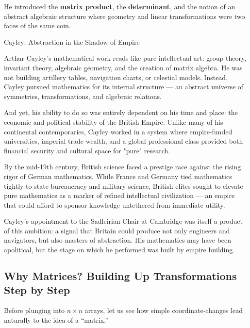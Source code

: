 He introduced the \textbf{matrix product}, the \textbf{determinant}, and the notion of an abstract algebraic structure  
where geometry and linear transformations were two faces of the same coin.

\begin{HistoricalSidebar}{Cayley: Abstraction in the Shadow of Empire}

Arthur Cayley’s mathematical work reads like pure intellectual art: group theory, invariant theory, 
algebraic geometry, and the creation of matrix algebra. He was not building artillery tables, 
navigation charts, or celestial models. Instead, Cayley pursued mathematics for its internal 
structure — an abstract universe of symmetries, transformations, and algebraic relations.

\medskip

And yet, his ability to do so was entirely dependent on his time and place: the economic and political 
stability of the British Empire. Unlike many of his continental contemporaries, Cayley worked in a 
system where empire-funded universities, imperial trade wealth, and a global professional class provided 
both financial security and cultural space for "pure" research.

\medskip

By the mid-19th century, British science faced a prestige race against the rising rigor of German 
mathematics. While France and Germany tied mathematics tightly to state bureaucracy and military 
science, British elites sought to elevate pure mathematics as a marker of refined intellectual 
civilization — an empire that could afford to sponsor knowledge untethered from immediate utility.

\medskip

Cayley’s appointment to the Sadleirian Chair at Cambridge was itself a product of this ambition: 
a signal that Britain could produce not only engineers and navigators, but also masters of abstraction. 
His mathematics may have been apolitical, but the stage on which he performed was built by empire building.

\end{HistoricalSidebar}

\subsection{Why Matrices? Building Up Transformations Step by Step}

Before plunging into \(n\times n\) arrays, let us see how simple coordinate‐changes lead naturally to the idea of a “matrix.”


